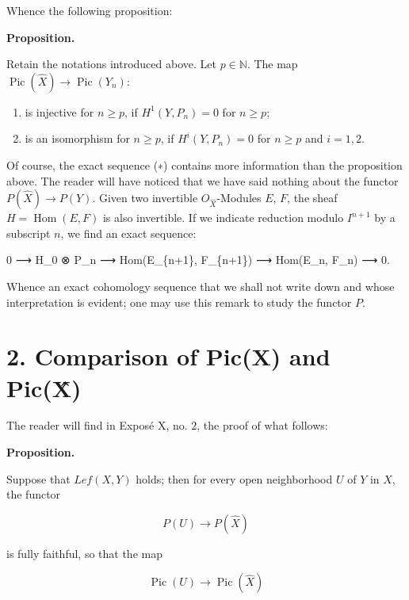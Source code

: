 \documentclass[
  11pt,
  a4paper,
]{book}
\newenvironment{Shaded}{}{}
\newcommand{\NormalTok}[1]{#1}
\providecommand{\tightlist}{%
  \setlength{\itemsep}{0pt}\setlength{\parskip}{0pt}}
\begin{document}
Whence the following proposition:

\textbf{Proposition.}

Retain the notations introduced above. Let \(p \in \mathbb{N}\). The map
\(\operatorname{Pic}(\hat{X}) \to
\operatorname{Pic}(Y_{n})\):

\begin{enumerate}
\def\labelenumi{\arabic{enumi}.}
\tightlist
\item
  is injective for \(n \geqslant p\), if \(H^{1}(Y, P_{n}) = 0\) for
  \(n \geqslant p\);
\item
  is an isomorphism for \(n \geqslant p\), if \(H^{i}(Y, P_{n}) = 0\)
  for \(n \geqslant p\) and \(i = 1, 2\).
\end{enumerate}

Of course, the exact sequence (∗) contains more information than the
proposition above. The reader will have noticed that we have said
nothing about the functor \(P(\hat{X}) \to P(Y)\). Given two invertible
\(O_{\hat{X}}\)-Modules \(E\), \(F\), the sheaf
\(H = \operatorname{Hom}(E, F)\) is also invertible. If we indicate
reduction modulo \(I^{n+1}\) by a subscript \(n\), we find an exact
sequence:

\begin{Shaded}
\begin{Highlighting}[]
\NormalTok{0 ⟶ H\_0 ⊗ P\_n ⟶ Hom(E\_\{n+1\}, F\_\{n+1\}) ⟶ Hom(E\_n, F\_n) ⟶ 0.}
\end{Highlighting}
\end{Shaded}

Whence an exact cohomology sequence that we shall not write down and
whose interpretation is evident; one may use this remark to study the
functor \(P\).

\section{2. Comparison of Pic(X) and
Pic(X̂)}\label{comparison-of-picx-and-picx}

The reader will find in Exposé X, no. 2, the proof of what follows:

\textbf{Proposition.}

Suppose that \(Lef(X, Y)\) holds; then for every open neighborhood \(U\)
of \(Y\) in \(X\), the functor

\[ P(U) \longrightarrow P(\hat{X}) \]

is fully faithful, so that the map

\[ \operatorname{Pic}(U) \longrightarrow \operatorname{Pic}(\hat{X}) \]
\end{document}
